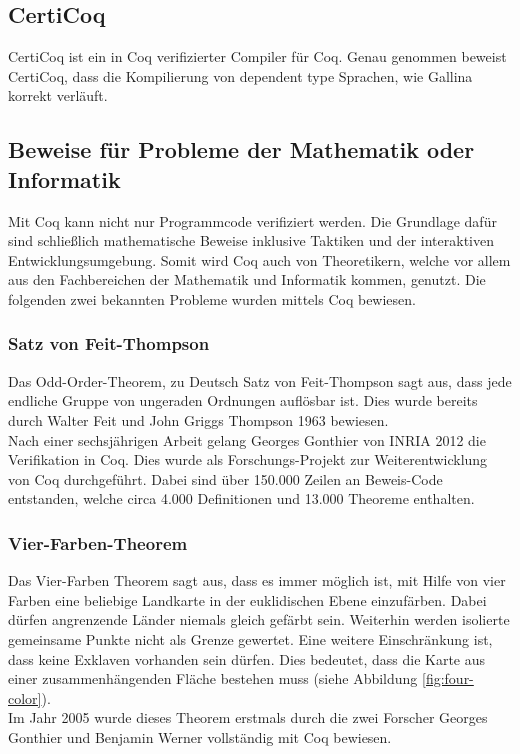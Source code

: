 \subsection{CertiCoq}
CertiCoq ist ein in Coq verifizierter Compiler für Coq. Genau genommen beweist CertiCoq, dass die Kompilierung von dependent type Sprachen, wie Gallina korrekt verläuft.\cite{CERTICOQ01:FV}\cite{CERTICOQ02:FV}

\subsection{Beweise für Probleme der Mathematik oder Informatik}
Mit Coq kann nicht nur Programmcode verifiziert werden. Die Grundlage dafür sind schließlich mathematische Beweise inklusive Taktiken und der interaktiven Entwicklungsumgebung. Somit wird Coq auch von Theoretikern, welche vor allem aus den Fachbereichen der Mathematik und Informatik kommen, genutzt. Die folgenden zwei bekannten Probleme wurden mittels Coq bewiesen. 

\subsubsection{Satz von Feit-Thompson}
Das Odd-Order-Theorem, zu Deutsch Satz von Feit-Thompson sagt aus, dass jede endliche Gruppe von ungeraden Ordnungen auflösbar ist. Dies wurde bereits durch Walter Feit und John Griggs Thompson 1963 bewiesen.\cite{ODD01:FV}\\
Nach einer sechsjährigen Arbeit gelang Georges Gonthier von INRIA 2012 die Verifikation in Coq. Dies wurde als Forschungs-Projekt zur Weiterentwicklung von Coq durchgeführt. Dabei sind über 150.000 Zeilen an Beweis-Code entstanden, welche circa 4.000 Definitionen und 13.000 Theoreme enthalten.\cite{ODD01:FV}

\subsubsection{Vier-Farben-Theorem}
Das Vier-Farben Theorem sagt aus, dass es immer möglich ist, mit Hilfe von vier Farben eine beliebige Landkarte in der euklidischen Ebene einzufärben. Dabei dürfen angrenzende Länder niemals gleich gefärbt sein. Weiterhin werden isolierte gemeinsame Punkte nicht als Grenze gewertet. Eine weitere Einschränkung ist, dass keine Exklaven vorhanden sein dürfen. Dies bedeutet, dass die Karte aus einer zusammenhängenden Fläche bestehen muss (siehe Abbildung \ref{fig:four-color}).\cite{FOURCOLORS01:FV}\\
Im Jahr 2005 wurde dieses Theorem erstmals durch die zwei Forscher Georges Gonthier und Benjamin Werner vollständig mit Coq bewiesen.
\cite{FOURCOLORS02:FV}\\

